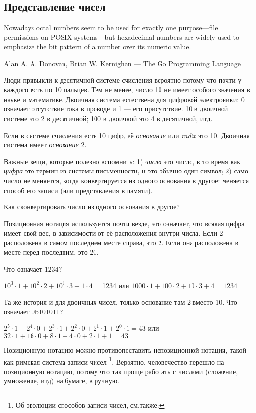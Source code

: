 \subsection{Представление чисел}

\epigraph{Nowadays octal numbers seem to be
used for exactly one purpose---file permissions on POSIX systems---but hexadecimal numbers
are widely used to emphasize the bit pattern of a number over its numeric value.}
{Alan A. A. Donovan, Brian W. Kernighan ---  The Go Programming Language}

Люди привыкли к десятичной системе счисления вероятно потому что почти у каждого есть по 10 пальцев.
Тем не менее, число 10 не имеет особого значения в науке и математике.
Двоичная система естествена для цифровой электроники: 0 означает отсутствие тока в проводе и 1 --- его присутствие.
10 в двоичной системе это 2 в десятичной; 100 в двоичной это 4 в десятичной, итд.

Если в системе счисления есть 10 цифр, её \emph{основание} или \emph{radix} это 10.
Двоичная система имеет \emph{основание} 2.

Важные вещи, которые полезно вспомнить:
1) \emph{число} это число, в то время как \emph{цифра} это термин из системы письменности, и это обычно один символ;
2) само число не меняется, когда конвертируется из одного основания в другое: меняется способ его записи (или представления
в памяти).

Как сконвертировать число из одного основания в другое?

Позиционная нотация используется почти везде, это означает, что всякая цифра имеет свой вес, в зависимости от её расположения
внутри числа.
Если 2 расположена в самом последнем месте справа, это 2.
Если она расположена в месте перед последним, это 20.

Что означает $1234$?

$10^3 \cdot 1 + 10^2 \cdot 2 + 10^1 \cdot 3 + 1 \cdot 4$ = 1234 или
$1000 \cdot 1 + 100 \cdot 2 + 10 \cdot 3 + 4 = 1234$

Та же история и для двоичных чисел, только основание там 2 вместо 10.
Что означает 0b101011?

$2^5 \cdot 1 + 2^4 \cdot 0 + 2^3 \cdot 1 + 2^2 \cdot 0 + 2^1 \cdot 1 + 2^0 \cdot 1 = 43$ или
$32 \cdot 1 + 16 \cdot 0 + 8 \cdot 1 + 4 \cdot 0 + 2 \cdot 1 + 1 = 43$

Позиционную нотацию можно противопоставить непозиционной нотации, такой как римская система записи чисел
\footnote{Об эволюции способов записи чисел, см.также: }.
Вероятно, человечество перешло на позиционную нотацию, потому что так проще работать с числами (сложение, умножение, итд)
на бумаге, в ручную.

